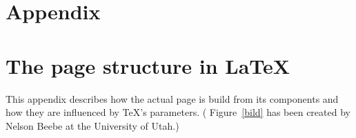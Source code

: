 
\clearpage

\section*{Appendix}

\appendix

\section{The page structure in \LaTeX}

This appendix describes how the actual page is build from its 
components and how they are influenced by \TeX{}'s parameters. 
( Figure~\ref{bild} has been created by 
Nelson Beebe at the University of Utah.)

